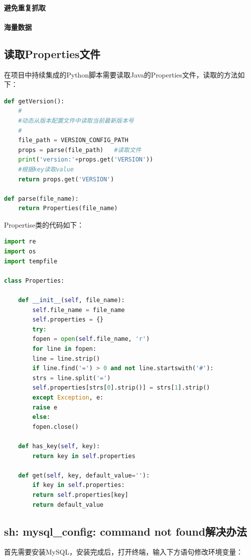\documentclass[letter]{book}
\begin{document}
\paragraph{避免重复抓取}

\paragraph{海量数据}

\subsection{读取Properties文件}

在项目中持续集成的Python脚本需要读取Java的Properties文件，读取的方法如下：

\begin{lstlisting}[language=Python]
def getVersion():
	#
	#动态从版本配置文件中读取当前最新版本号
	#
	file_path = VERSION_CONFIG_PATH
	props = parse(file_path)   #读取文件
	print('version:'+props.get('VERSION'))
	#根据key读取value
	return props.get('VERSION')            

def parse(file_name):
	return Properties(file_name)
\end{lstlisting}

Propertise类的代码如下：

\begin{lstlisting}[language=Python]
import re
import os
import tempfile

class Properties:

	def __init__(self, file_name):
		self.file_name = file_name
		self.properties = {}
		try:
		fopen = open(self.file_name, 'r')
		for line in fopen:
		line = line.strip()
		if line.find('=') > 0 and not line.startswith('#'):
		strs = line.split('=')
		self.properties[strs[0].strip()] = strs[1].strip()
		except Exception, e:
		raise e
		else:
		fopen.close()
	
	def has_key(self, key):
		return key in self.properties
	
	def get(self, key, default_value=''):
		if key in self.properties:
		return self.properties[key]
		return default_value
\end{lstlisting}


\subsection{sh: mysql\_config: command not found解决办法}

首先需要安装MySQL，安装完成后，打开终端，输入下方语句修改环境变量：
\end{document}

